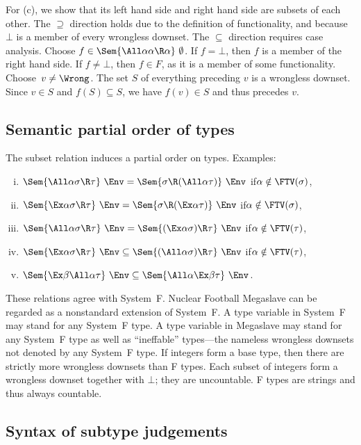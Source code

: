 \documentclass{amsart}
\theoremstyle{definition}
\begin{document}
For (c), we show that its left hand side and right hand side are
subsets of each other. The $\supseteq$ direction holds due to the
definition of functionality, and because $\bot$ is a member of
every wrongless downset. The $\subseteq$ direction requires case
analysis. Choose $f\in\Sem{\All\alpha\alpha\R\alpha}~\emptyset$.
If $f=\bot$, then $f$ is a member of the right hand side. If
$f\neq\bot$, then $f\in F$, as it is a member of some
functionality. Choose~$v\neq\Wrong$. The set $S$ of everything
preceding $v$ is a wrongless downset. Since $v\in S$ and
$f(S)\subseteq S$, we have $f(v)\in S$ and thus precedes $v$.

\subsection{Semantic partial order of types}
The subset relation induces a partial order on types. Examples:
\begin{enumerate}[(i)]
\item
$\Sem{\All\alpha\sigma\R\tau}~\Env
=
\Sem{\sigma\R(\All\alpha\tau)}~\Env$
\quad if\quad $\alpha\notin\FTV(\sigma)$,
\item
$\Sem{\Ex\alpha\sigma\R\tau}~\Env
=
\Sem{\sigma\R(\Ex\alpha\tau)}~\Env$
\quad if\quad $\alpha\notin\FTV(\sigma)$,
\item
$\Sem{\All\alpha\sigma\R\tau}~\Env
=
\Sem{(\Ex\alpha\sigma)\R\tau}~\Env$
\quad if\quad $\alpha\notin\FTV(\tau)$,
\item
$\Sem{\Ex\alpha\sigma\R\tau}~\Env
\subseteq
\Sem{(\All\alpha\sigma)\R\tau}~\Env$
\quad if\quad $\alpha\notin\FTV(\tau)$,
\item
$\Sem{\Ex\beta\All\alpha\tau}~\Env
\subseteq
\Sem{\All\alpha\Ex\beta\tau}~\Env$.
\end{enumerate}
These relations agree with System~F. Nuclear Football Megaslave
can be regarded as a nonstandard extension of System~F. A type
variable in System~F may stand for any System~F type. A type
variable in Megaslave may stand for any System~F type as well as
``ineffable'' types---the nameless wrongless downsets not denoted
by any System~F type. If integers form a base type, then there
are strictly more wrongless downsets than F types. Each subset of
integers form a wrongless downset together with $\bot$; they are
uncountable. F types are strings and thus always countable.

\subsection{Syntax of subtype judgements}
\end{document}
